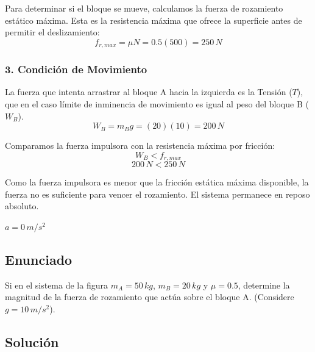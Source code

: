 \documentclass[12pt, a4paper]{article}
\begin{document}
Para determinar si el bloque se mueve, calculamos la fuerza de rozamiento estático máxima. Esta es la resistencia máxima que ofrece la superficie antes de permitir el deslizamiento:
$$ f_{r,max} = \mu N = 0.5(500) = 250\,\si{N} $$

\subsubsection*{3. Condición de Movimiento}
La fuerza que intenta arrastrar al bloque A hacia la izquierda es la Tensión ($T$), que en el caso límite de inminencia de movimiento es igual al peso del bloque B ($W_B$).
$$ W_B = m_B g = (20)(10) = 200\,\si{N} $$

Comparamos la fuerza impulsora con la resistencia máxima por fricción:
$$ W_B < f_{r,max} $$
$$ 200\,\si{N} < 250\,\si{N} $$

Como la fuerza impulsora es menor que la fricción estática máxima disponible, la fuerza no es suficiente para vencer el rozamiento. El sistema permanece en reposo absoluto.

\begin{tcolorbox}[colback=green!5!white, colframe=green!50!black, title=Respuesta Final]
\centering \Large $a = 0\,\si{m/s^2}$
\end{tcolorbox}

\newpage

\subsection*{Enunciado}
Si en el sistema de la figura $m_A = 50\,\si{kg}$, $m_B = 20\,\si{kg}$ y $\mu = 0.5$, determine la magnitud de la fuerza de rozamiento que actúa sobre el bloque A. (Considere $g = 10\,\si{m/s^2}$).

\begin{center}
\end{center}

\subsection*{Solución}
\end{document}
